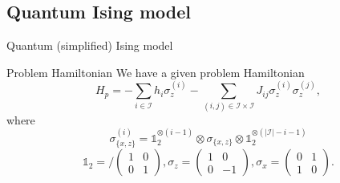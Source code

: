\subsection{Quantum Ising model}
\begin{frame}{Quantum (simplified) Ising model}
\begin{block}{Problem Hamiltonian}
We have a given problem Hamiltonian
$$
H_p = - \sum_{i\in \mathcal{I}} h_i \sigma_z^{(i)} - \sum_{(i,j)\in \mathcal{I}\times \mathcal{I}} J_{ij} \sigma_z^{(i)}  \sigma_z^{(j)},
$$
where
$$
\sigma_{\{x,z\}}^{(i)} = \mathbb{1}_2^{\otimes (i-1)} \otimes \sigma_{\{x,z\}} \otimes \mathbb{1}_2^{\otimes (|\mathcal{I}|-i-1)}
$$
$$
\mathbb{1}_2 = /
\begin{pmatrix}
1 & 0\\
0 & 1
\end{pmatrix},
\sigma_z = 
\begin{pmatrix}
1 & 0\\
0 & -1
\end{pmatrix},
\sigma_x = 
\begin{pmatrix}
0 & 1\\
1 & 0
\end{pmatrix}.
$$
\end{block}
\end{frame}
